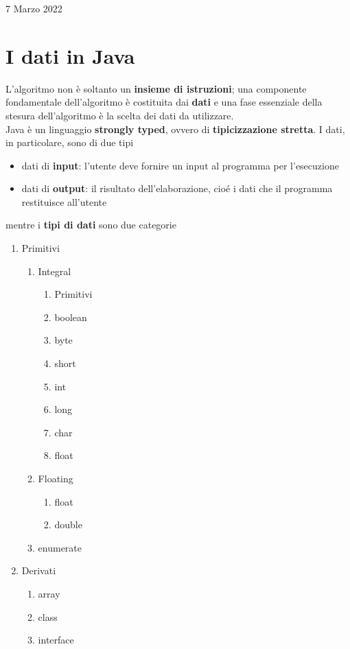 \documentclass[a4paper]{extarticle}
\begin{document}
\newpage
\noindent
\begin{center}
  7 Marzo 2022
\end{center}

\section{I dati in Java}
L’algoritmo non è soltanto un \textbf{insieme di istruzioni}; una componente fondamentale dell’algoritmo è costituita dai \textbf{dati} e una fase essenziale della stesura dell’algoritmo è la scelta dei dati da utilizzare.\\
Java è un linguaggio \textbf{strongly typed}, ovvero di \textbf{tipicizzazione stretta}. I dati, in particolare, sono di due tipi
\begin{itemize}
  \item dati di \textbf{input}: l'utente deve fornire un input al programma per l'esecuzione
  \item dati di \textbf{output}: il risultato dell'elaborazione, cioé i dati che il programma restituisce all'utente
\end{itemize}
mentre i \textbf{tipi di dati} sono due categorie
\begin{enumerate}
  \item Primitivi
  \begin{enumerate}
    \item Integral
    \begin{enumerate}
      \item Primitivi
      \item boolean
      \item byte
      \item short
      \item int
      \item long
      \item char
      \item float
    \end{enumerate}
    \item Floating
    \begin{enumerate}
      \item float
      \item double
    \end{enumerate}
    \item enumerate
  \end{enumerate}
  \item Derivati
  \begin{enumerate}
    \item array
    \item class
    \item interface
  \end{enumerate}
\end{enumerate}
\end{document}
